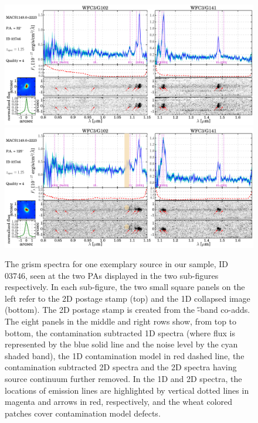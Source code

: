 \begin{figure}
    \centering
    \includegraphics[width=.92\textwidth]{fig/spectra_id03746_pa32.pdf}\\
    \includegraphics[width=.92\textwidth]{fig/spectra_id03746_pa125.pdf}
    \caption[The \hst grism spectra for one exemplary source in our sample ID 03746.]
    {The \hst grism spectra for one exemplary source in our sample, ID 03746, seen at the two \glass PAs displayed in the 
    two sub-figures respectively. 
    In each sub-figure, the two small square panels on the left refer to the 2D
    postage stamp (top) and the 1D collapsed image (bottom). The 2D postage stamp is created from the \hff \H-band co-adds. 
    The eight panels in the middle and right rows show, from top to bottom, the contamination subtracted 1D spectra (where flux is 
    represented by the blue solid line and the noise level by the cyan shaded band), the 1D contamination model in red dashed 
    line, the contamination subtracted 2D spectra and the 2D spectra having source continuum further removed.
    In the 1D and 2D spectra, the locations of emission lines are highlighted by vertical dotted lines in magenta and arrows in 
    red, respectively, and the wheat colored patches cover contamination model defects.}
    \label{fig:3746}
\end{figure}

